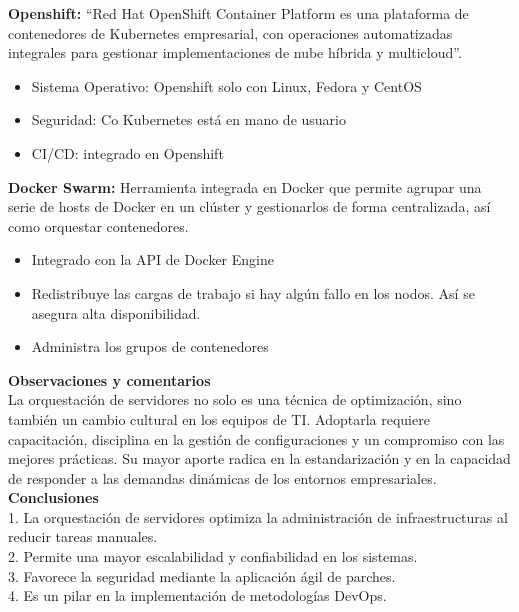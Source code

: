 \documentclass[12pt,letterpaper]{article}
\begin{document}
\textbf{Openshift:} “Red Hat OpenShift Container Platform es una plataforma de contenedores de Kubernetes empresarial, con operaciones automatizadas integrales para gestionar implementaciones de nube híbrida y multicloud”.
\begin{itemize}
    \item Sistema Operativo: Openshift solo con Linux, Fedora y CentOS
\end{itemize}
\begin{itemize}
    \item Seguridad: Co Kubernetes está en mano de usuario
\end{itemize}
\begin{itemize}
    \item CI/CD: integrado en Openshift
\end{itemize}

\textbf{Docker Swarm:} Herramienta integrada en Docker que permite agrupar una serie de hosts de Docker en un clúster y gestionarlos de forma centralizada, así como orquestar contenedores.
\begin{itemize}
    \item Integrado con la API de Docker Engine
\end{itemize}
\begin{itemize}
    \item Redistribuye las cargas de trabajo si hay algún fallo en los nodos. Así se asegura alta disponibilidad.
\end{itemize}
\begin{itemize}
    \item Administra los grupos de contenedores
\end{itemize}




\textbf{Observaciones y comentarios} \\
La orquestación de servidores no solo es una técnica de optimización, sino también un cambio cultural en los equipos de TI. Adoptarla requiere capacitación, disciplina en la gestión de configuraciones y un compromiso con las mejores prácticas. Su mayor aporte radica en la estandarización y en la capacidad de responder a las demandas dinámicas de los entornos empresariales. \\

\textbf{Conclusiones} \\
1. La orquestación de servidores optimiza la administración de infraestructuras al reducir tareas manuales. \\
2. Permite una mayor escalabilidad y confiabilidad en los sistemas. \\
3. Favorece la seguridad mediante la aplicación ágil de parches. \\
4. Es un pilar en la implementación de metodologías DevOps. \\
\end{document}
